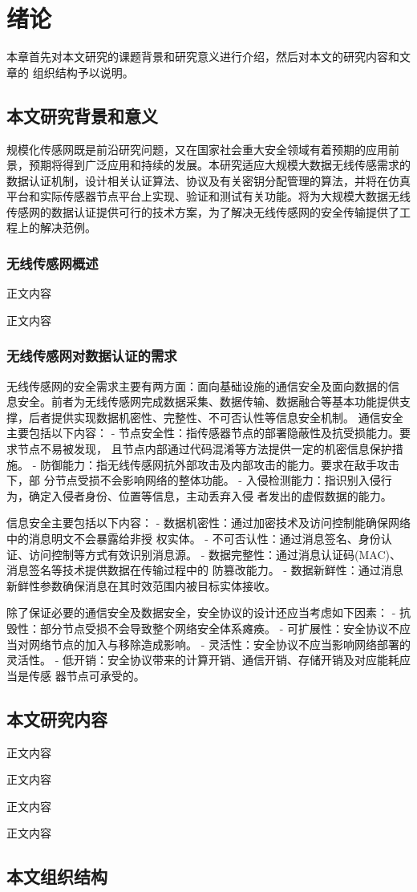 \chapter{绪论}
本章首先对本文研究的课题背景和研究意义进行介绍，然后对本文的研究内容和文章的
组织结构予以说明。
\section{本文研究背景和意义}
规模化传感网既是前沿研究问题，又在国家社会重大安全领域有着预期的应用前景，预期将得到广泛应用和持续的发展。本研究适应大规模大数据无线传感需求的数据认证机制，设计相关认证算法、协议及有关密钥分配管理的算法，并将在仿真平台和实际传感器节点平台上实现、验证和测试有关功能。将为大规模大数据无线传感网的数据认证提供可行的技术方案，为了解决无线传感网的安全传输提供了工程上的解决范例。



\subsection{无线传感网概述}
正文内容

正文内容


\subsection{无线传感网对数据认证的需求}
无线传感网的安全需求主要有两方面：面向基础设施的通信安全及面向数据的信
息安全。前者为无线传感网完成数据采集、数据传输、数据融合等基本功能提供支
撑，后者提供实现数据机密性、完整性、不可否认性等信息安全机制。
通信安全主要包括以下内容：
- 节点安全性：指传感器节点的部署隐蔽性及抗受损能力。要求节点不易被发现，
且节点内部通过代码混淆等方法提供一定的机密信息保护措施。
- 防御能力：指无线传感网抗外部攻击及内部攻击的能力。要求在敌手攻击下，部
分节点受损不会影响网络的整体功能。
- 入侵检测能力：指识别入侵行为，确定入侵者身份、位置等信息，主动丢弃入侵
者发出的虚假数据的能力。

信息安全主要包括以下内容：
- 数据机密性：通过加密技术及访问控制能确保网络中的消息明文不会暴露给非授
权实体。
- 不可否认性：通过消息签名、身份认证、访问控制等方式有效识别消息源。
- 数据完整性：通过消息认证码(MAC)、消息签名等技术提供数据在传输过程中的
防篡改能力。
- 数据新鲜性：通过消息新鲜性参数确保消息在其时效范围内被目标实体接收。


除了保证必要的通信安全及数据安全，安全协议的设计还应当考虑如下因素：
- 抗毁性：部分节点受损不会导致整个网络安全体系瘫痪。
- 可扩展性：安全协议不应当对网络节点的加入与移除造成影响。
- 灵活性：安全协议不应当影响网络部署的灵活性。
- 低开销：安全协议带来的计算开销、通信开销、存储开销及对应能耗应当是传感
器节点可承受的。

\section{本文研究内容}
正文内容

正文内容

正文内容

正文内容

\section{本文组织结构}


